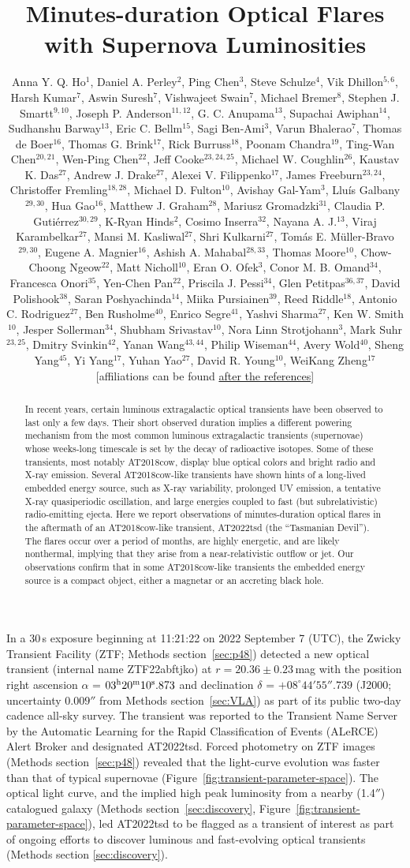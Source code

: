 \documentclass{nature_plusfigure}
\title{Minutes-duration Optical Flares with Supernova Luminosities}
\author{Anna Y. Q. Ho$^{1}$, Daniel A. Perley$^{2}$, Ping Chen$^{3}$, Steve Schulze$^{4}$, Vik Dhillon$^{5,6}$, Harsh Kumar$^{7}$, Aswin Suresh$^{7}$, Vishwajeet Swain$^{7}$, Michael Bremer$^{8}$, Stephen J. Smartt$^{9,10}$, Joseph P. Anderson$^{11,12}$, G. C. Anupama$^{13}$, Supachai Awiphan$^{14}$, Sudhanshu Barway$^{13}$, Eric C. Bellm$^{15}$, Sagi Ben-Ami$^{3}$, Varun Bhalerao$^{7}$, Thomas de Boer$^{16}$, Thomas G. Brink$^{17}$, Rick Burruss$^{18}$, Poonam Chandra$^{19}$, Ting-Wan Chen$^{20,21}$, Wen-Ping Chen$^{22}$, Jeff Cooke$^{23,24,25}$, Michael W. Coughlin$^{26}$, Kaustav K. Das$^{27}$, Andrew J. Drake$^{27}$, Alexei V. Filippenko$^{17}$, James Freeburn$^{23,24}$, Christoffer Fremling$^{18,28}$, Michael D. Fulton$^{10}$, Avishay Gal-Yam$^{3}$, Llu\'is Galbany$^{29,30}$, Hua Gao$^{16}$, Matthew J. Graham$^{28}$, Mariusz Gromadzki$^{31}$, Claudia P. Guti\'errez$^{30,29}$, K-Ryan Hinds$^{2}$, Cosimo Inserra$^{32}$, Nayana A. J.$^{13}$, Viraj Karambelkar$^{27}$, Mansi M. Kasliwal$^{27}$, Shri Kulkarni$^{27}$, Tom\'as E. M\"uller-Bravo$^{29,30}$, Eugene A. Magnier$^{16}$, Ashish A. Mahabal$^{28,33}$, Thomas Moore$^{10}$, Chow-Choong Ngeow$^{22}$, Matt Nicholl$^{10}$, Eran O. Ofek$^{3}$, Conor M. B. Omand$^{34}$, Francesca Onori$^{35}$, Yen-Chen Pan$^{22}$, Priscila J. Pessi$^{34}$, Glen Petitpas$^{36,37}$, David Polishook$^{38}$, Saran Poshyachinda$^{14}$, Miika Pursiainen$^{39}$, Reed Riddle$^{18}$, Antonio C. Rodriguez$^{27}$, Ben Rusholme$^{40}$, Enrico Segre$^{41}$, Yashvi Sharma$^{27}$, Ken W. Smith$^{10}$, Jesper Sollerman$^{34}$, Shubham Srivastav$^{10}$, Nora Linn Strotjohann$^{3}$, Mark Suhr$^{23,25}$, Dmitry Svinkin$^{42}$, Yanan Wang$^{43,44}$, Philip Wiseman$^{44}$, Avery Wold$^{40}$, Sheng Yang$^{45}$, Yi Yang$^{17}$, Yuhan Yao$^{27}$, David R. Young$^{10}$, WeiKang Zheng$^{17}$
[affiliations can be found \hyperref[sec:affiliations]{after the references}]
	}
\begin{document}
\maketitle

\begin{abstract}

In recent years, certain luminous extragalactic optical transients have been observed to last only a few days\cite{Drout2014}. Their short observed duration implies a different powering mechanism from the most common luminous extragalactic transients (supernovae) whose weeks-long timescale is set by the decay of radioactive isotopes\cite{Kasen2017}. Some of these transients, most notably AT2018cow\cite{Prentice2018}, display blue optical colors and bright radio and X-ray emission\cite{Ho2023}. Several AT2018cow-like transients have shown hints of a long-lived embedded energy source\cite{Margutti2019}, such as X-ray variability\cite{RiveraSandoval2018,Yao2022},
prolonged UV emission\cite{Chen2023}, a tentative X-ray quasiperiodic oscillation\cite{Pasham2021,Zhang2022}, and large energies coupled to fast (but subrelativistic) radio-emitting ejecta\cite{Ho2020_Koala,Coppejans2020}. Here we report observations of minutes-duration optical flares in the aftermath of an AT2018cow-like transient, AT2022tsd (the ``Tasmanian Devil''). The flares occur over a period of months, are highly energetic, and are likely nonthermal, implying that they arise from a near-relativistic outflow or jet. Our observations confirm that in some AT2018cow-like transients the embedded energy source is a compact object, either a magnetar or an accreting black hole.

\end{abstract}

In a 30\,s exposure beginning at 11:21:22 on 2022 September 7 (UTC), the Zwicky Transient Facility (ZTF; Methods section~\ref{sec:p48}) detected a new optical transient (internal name ZTF22abftjko) at $r=20.36\pm0.23\,$mag with the position right ascension $\alpha$ = $03^{\rm{h}}20^{\rm{m}}10^{\rm{s}}.873$ and declination $\delta$ = $+08^{\circ} 44' 55''.739$ 
(J2000; uncertainty $0.009''$ from Methods section~\ref{sec:VLA}) as part of its public two-day cadence all-sky survey.
The transient was reported\cite{Munoz-Arancibia2022} to the Transient Name Server by the Automatic Learning for the Rapid Classification of Events (ALeRCE) Alert Broker\cite{Forster2021} and designated AT2022tsd.
Forced photometry on ZTF images (Methods section~\ref{sec:p48}) revealed that the light-curve evolution was faster than that of typical supernovae (Figure~\ref{fig:transient-parameter-space}).
The optical light curve, and the implied high peak luminosity from a nearby (1.4$''$) catalogued galaxy (Methods section~\ref{sec:discovery}, Figure~\ref{fig:transient-parameter-space}), led AT2022tsd to be flagged as a transient of interest as part of ongoing efforts to discover luminous and fast-evolving optical transients (Methods section \ref{sec:discovery}).
\end{document}
